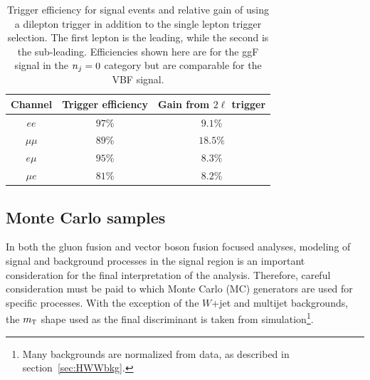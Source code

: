 \begin{table}[h!]
\centering
\captionsetup{justification=centering}

\hspace{-10pt}
\begin{tabular}{|c|c|c|}
\hline
Channel & Trigger efficiency & Gain from $2\ell$ trigger \\ \hline \hline
$ee$ & $97$\% & $9.1$\% \\ \hline
$\mu\mu$ & $89$\% & $18.5$\% \\ \hline
$e\mu$ & $95$\% & $8.3$\% \\ \hline
$\mu e$ & $81$\% & $8.2$\% \\ \hline
\end{tabular}

\caption{
Trigger efficiency for signal events and relative gain of using a dilepton trigger in addition to the single lepton trigger selection. The first lepton is the leading, while the second is the sub-leading. Efficiencies shown here are for the ggF signal in the $n_j = 0$ category but are comparable for the VBF signal. 
}
\label{tab:trigeff}
\end{table}

\subsection{Monte Carlo samples}
\label{sec:HWWMC}

In both the gluon fusion and vector boson fusion focused analyses, modeling of signal and background processes in the signal region is an important consideration for the final interpretation of the analysis. Therefore, careful consideration must be paid to which Monte Carlo (MC) generators are used for specific processes. With the exception of the $W$+jet and multijet backgrounds, the $m_{\textrm{\footnotesize\sc t}}$ shape used as the final discriminant is taken from simulation\footnote{Many backgrounds are normalized from data, as described in section~\ref{sec:HWWbkg}.}. 

